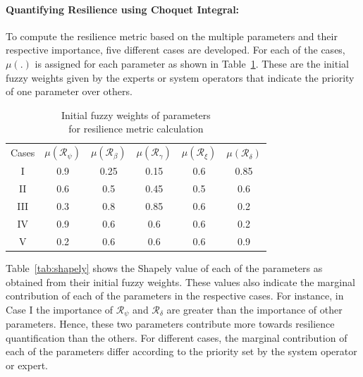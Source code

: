 \paragraph{Quantifying Resilience using Choquet Integral:}
To compute the resilience metric based on the multiple parameters and their respective importance, five different cases are developed. For each of the cases, $\mu(.)$ is assigned for each parameter as shown in Table~\ref{tab:weights}. These are the initial fuzzy weights given by the experts or system operators that indicate the priority of one parameter over others.   


\begin{table}[h]
    \centering
    \caption{Initial fuzzy weights of parameters \\ for resilience metric calculation}
    \begin{tabular}{c|c|c|c|c|c}
    \hline
          Cases & $\mu(\mathcal{R}_\psi)$ & $\mu(\mathcal{R}_\beta)$ & $\mu(\mathcal{R}_\gamma)$ & $\mu(\mathcal{R}_\xi)$ & $\mu(\mathcal{R}_\delta)$  \\
    \hhline{======}
        I & 0.9 & 0.25 & 0.15 & 0.6 & 0.85 \\
    \hline
        II & 0.6 & 0.5 & 0.45 & 0.5 & 0.6 \\ 
    \hline
        III & 0.3 & 0.8 & 0.85 & 0.6 & 0.2 \\ 
    \hline
        IV & 0.9 & 0.6 & 0.6 & 0.6 & 0.2 \\ 
    \hline
        V & 0.2 & 0.6 & 0.6 & 0.6 & 0.9 \\ 
    \hline
    \end{tabular}
    \label{tab:weights}
\end{table}

Table~\ref{tab:shapely} shows the Shapely value of each of the parameters as obtained from their initial fuzzy weights. These values also indicate the marginal contribution of each of the parameters in the respective cases. For instance, in Case I the importance of $\mathcal{R}_\psi$ and $\mathcal{R}_\delta$ are greater than the importance of other parameters. Hence, these two parameters contribute more towards resilience quantification than the others. For different cases, the marginal contribution of each of the parameters differ according to the priority set by the system operator or expert.


